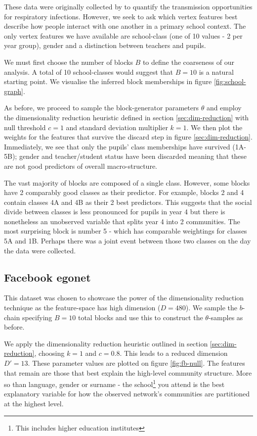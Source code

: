 These data were originally collected by \citet{schools} to quantify the transmission opportunities for respiratory infections. However, we seek to ask which vertex features best describe how people interact with one another in a primary school context. The only vertex features we have available are school-class (one of 10 values - 2 per year group), gender and a distinction between teachers and pupils.

We must first choose the number of blocks $B$ to define the coarseness of our analysis. A total of 10 school-classes would suggest that $B=10$ is a natural starting point. We visualise the inferred block memberships in figure \ref{fig:school-graph}.

As before, we proceed to sample the block-generator parameters $\theta$ and employ the dimensionality reduction heuristic defined in section \ref{sec:dim-reduction} with null threshold $c=1$ and standard deviation multiplier $k=1$. We then plot the weights for the features that survive the discard step in figure \ref{sec:dim-reduction}. Immediately, we see that only the pupils' class memberships have survived (1A-5B); gender and teacher/student status have been discarded meaning that these are not good predictors of overall macro-structure.

The vast majority of blocks are composed of a single class. However, some blocks have 2 comparably good classes as their predictor. For example, blocks 2 and 4 contain classes 4A and 4B as their 2 best predictors. This suggests that the social divide between classes is less pronounced for pupils in year 4 but there is nonetheless an unobserved variable that splits year 4 into 2 communities. The most surprising block is number 5 - which has comparable weightings for classes 5A and 1B. Perhaps there was a joint event between those two classes on the day the data were collected.

\subsection{Facebook egonet}

This dataset was chosen to showcase the power of the dimensionality reduction technique as the feature-space has high dimension ($D=480$). We sample the $b$-chain specifying $B=10$ total blocks and use this to construct the $\theta$-samples as before. 

We apply the dimensionality reduction heuristic outlined in section \ref{sec:dim-reduction}, choosing $k=1$ and $c=0.8$. This leads to a reduced dimension $D'=13$. These parameter values are plotted on figure \ref{fig:fb-null}. The features that remain are those that best explain the high-level community structure. More so than language, gender or surname - the school\footnote{This includes higher education institutes} you attend is the best explanatory variable for how the observed network's communities are partitioned at the highest level. 


